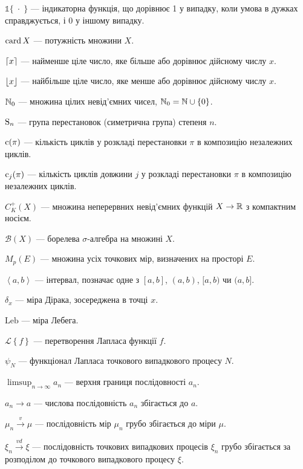 \hspace{\parindent}
$\mathds{1}\{\; \cdot\;\}$ --- індикаторна функція, що дорівнює 1 у випадку, коли умова в
дужках справджується, і 0 у іншому випадку.

$\card X$ --- потужність множини $X$. 

$\ceil*{x}$ --- найменше ціле число, яке більше або дорівнює дійсному числу $x$.%

$\floor*{x}$ --- найбільше ціле число, яке менше або дорівнює дійсному числу $x$.%

$\N_0$ --- множина цілих невід'ємних чисел, $\N_0 = \N \cup \{0\}$.

$\Sym{n}$ --- група перестановок (симетрична група) степеня $n$.

$\cycle({\pi})$ --- кількість циклів у розкладі перестановки $\pi$ в композицію
незалежних циклів.

$\cycle_j({\pi})$ --- кількість циклів довжини $j$ у розкладі перестановки $\pi$ в композицію
незалежних циклів.

$C_K^+(X)$ --- множина неперервних невід'ємних функцій
$X \to \R$ з компактним носієм.

$\mathcal{B}(X)$ --- борелева $\sigma$-алгебра на множині $X$.

$M_p(E)$ --- множина усіх точкових мір, визначених на просторі $E$.

$\left<a,b\right>$ --- інтервал, позначає одне з $[a, b]$, $(a, b)$, $[a, b)$ чи $(a, b]$.

$\delta_x$ --- міра Дірака, зосереджена в точці $x$.

$\mathrm{Leb}$ --- міра Лебега.

$\mathcal{L}\left\{f\right\}$ --- перетворення Лапласа функції $f$.

$\psi_N$ --- функціонал Лапласа точкового випадкового процесу $N$.

$\limsup_{n\to\infty} a_n$ --- верхня границя послідовності $a_n$.

$a_n \to a$ --- числова послідовність $a_n$ збігається до $a$.

$\mu_n \overset{v}{\longrightarrow} \mu$ --- послідовність мір $\mu_n$
грубо збігається до міри $\mu$.

$\xi_n \overset{vd}{\longrightarrow} \xi$ --- послідовність точкових випадкових процесів $\xi_n$
грубо збігається за розподілом до точкового випадкового процесу $\xi$.

